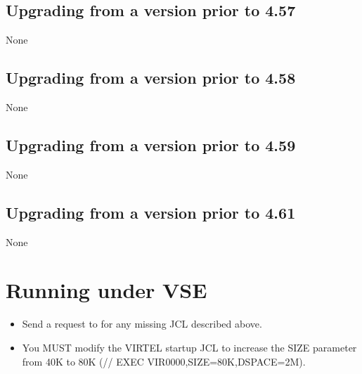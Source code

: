 \documentclass[letterpaper,10pt,english]{sphinxmanual}
\begin{document}
\ignorespaces 

\section{Upgrading from a version prior to 4.57}
\label{\detokenize{Migration_Guide:upgrading-from-a-version-prior-to-4-57}}\label{\detokenize{Migration_Guide:index-7}}
None


\section{Upgrading from a version prior to 4.58}
\label{\detokenize{Migration_Guide:upgrading-from-a-version-prior-to-4-58}}
None


\section{Upgrading from a version prior to 4.59}
\label{\detokenize{Migration_Guide:upgrading-from-a-version-prior-to-4-59}}
None


\section{Upgrading from a version prior to 4.61}
\label{\detokenize{Migration_Guide:upgrading-from-a-version-prior-to-4-61}}
None

\newpage

\ignorespaces 

\chapter{Running under VSE}
\label{\detokenize{Migration_Guide:running-under-vse}}\label{\detokenize{Migration_Guide:index-8}}\begin{itemize}
\item {} 
Send a request to  for any missing JCL described above.

\item {} 
You MUST modify the VIRTEL startup JCL to increase the SIZE parameter from 40K to 80K (// EXEC VIR0000,SIZE=80K,DSPACE=2M).

\end{itemize}
\end{document}
